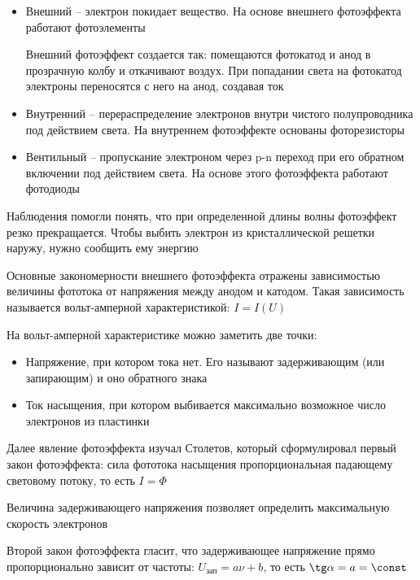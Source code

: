 \documentclass[12pt]{article}
\begin{document}
\begin{itemize}
    \item Внешний -- электрон покидает вещество. На основе внешнего фотоэффекта работают фотоэлементы
    
    Внешний фотоэффект создается так: помещаются фотокатод и анод в прозрачную колбу и откачивают воздух. При попадании света на фотокатод электроны переносятся с него на анод, создавая ток 

    \item Внутренний -- перераспределение электронов внутри чистого полупроводника под действием света. На внутреннем фотоэффекте основаны фоторезисторы

    \item Вентильный -- пропускание электроном через p-n переход при его обратном включении под действием света. На основе этого фотоэффекта работают фотодиоды
\end{itemize}


Наблюдения помогли понять, что при определенной длины волны фотоэффект резко прекращается. Чтобы выбить электрон из кристаллической решетки наружу, нужно сообщить ему энергию

Основные закономерности внешнего фотоэффекта отражены зависимостью величины фототока от напряжения между анодом и катодом. Такая зависимость называется вольт-амперной характеристикой: $I = I(U)$


На вольт-амперной характеристике можно заметить две точки:

\begin{itemize}
    \item Напряжение, при котором тока нет. Его называют задерживающим (или запирающим) и оно обратного знака
    \item Ток насыщения, при котором выбивается максимально возможное число электронов из пластинки
\end{itemize}

\mediumvspace

Далее явление фотоэффекта изучал Столетов, который сформулировал первый закон фотоэффекта: сила фототока насыщения пропорциональная падающему световому потоку, то есть $I = \Phi$

Величина задерживающего напряжения позволяет определить максимальную скорость электронов

Второй закон фотоэффекта гласит, что задерживающее напряжение прямо пропорционально зависит от частоты: $U_\text{зап} = a\nu + b$, то есть $\tg \alpha = a = \const$
\end{document}
